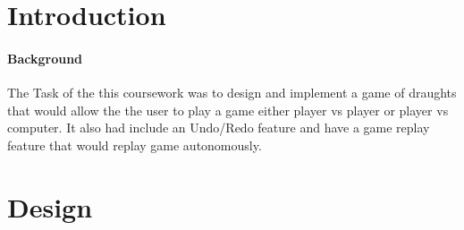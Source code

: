 \documentclass[10pt, a4paper]{article}
\title{\mytitle}
\author{\myauthor\hspace{1em}\\\contact\\Edinburgh Napier University\hspace{0.5em}-\hspace{0.5em}\mymodule}
\date{}
\begin{document}
    \maketitle
    \begin{abstract}
       The objective of this coursework was to demonstrate my understanding of Algorithms and Data Structures and apply it to a project. My task was to implement a game of draughts.
    \end{abstract}
    
    
    
    \section{Introduction}
    \paragraph{Background}
    The Task of the this coursework was to design and implement a game of draughts that would allow the the user to play a game either player vs player or player vs computer. It also had include an Undo/Redo feature and have a game replay feature that would replay game autonomously.   
    
   
	
	\section{Design}
\end{document}
